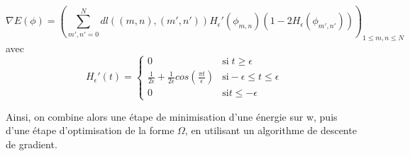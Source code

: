 \[ \nabla E (\phi) = \left( \sum \limits_{m',n' = 0}^N dl((m,n),(m',n')) H_{\epsilon}' (\phi_{m,n}) ( 1 - 2H_{\epsilon}(\phi_{m',n'})) \right) _{1 \leq m,n \leq N}  \] 
avec 
\[ H_{\epsilon}' (t) = \left\{ \begin{matrix}
0 & \text{si} \; t \geq \epsilon \\
\frac{1}{2 \epsilon} + \frac{1}{2 \epsilon} cos(\frac{\pi t}{\epsilon}) & \text{si} -\epsilon \leq t \leq \epsilon \\
0 & \text{si} t \leq - \epsilon 
\end{matrix} \right. \] 

Ainsi, on combine alors une étape de minimisation d'une énergie sur w, puis d'une étape d'optimisation de la forme $\Omega$, en utilisant un algorithme de descente de gradient. 
